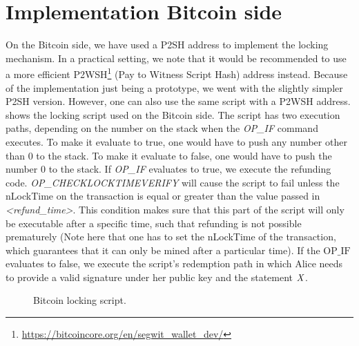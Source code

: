\section{Implementation Bitcoin side}\label{sec:ImplementationBtc}

On the Bitcoin side, we have used a P2SH address to implement the locking mechanism.
In a practical setting, we note that it would be recommended to use a more efficient P2WSH\footnote{\url{https://bitcoincore.org/en/segwit_wallet_dev/}} (Pay to Witness Script Hash) address instead.
Because of the implementation just being a prototype, we went with the slightly simpler P2SH version.
However, one can also use the same script with a P2WSH address.
 shows the locking script used on the Bitcoin side.
The script has two execution paths, depending on the number on the stack when the \textit{OP\_IF} command executes.
To make it evaluate to true, one would have to push any number other than 0 to the stack.
To make it evaluate to false, one would have to push the number 0 to the stack.
If \textit{OP\_IF} evaluates to true, we execute the refunding code.
\textit{OP\_CHECKLOCKTIMEVERIFY} will cause the script to fail unless the nLockTime on the transaction is equal or greater than the value passed in \textit{<refund\_time>}.
This condition makes sure that this part of the script will only be executable after a specific time, such that refunding is not possible prematurely (Note here that one has to set the nLockTime of the transaction, which guarantees that it can only be mined after a particular time).
If the $\text{OP\_IF}$ evaluates to false, we execute the script's redemption path in which Alice needs to provide a valid signature under her public key and the statement $\mathit{X}$.


\begin{figure}
    \begin{center}
    \end{center}
    \caption{Bitcoin locking script.}\label{fig:bitcoin-script}
\end{figure}

